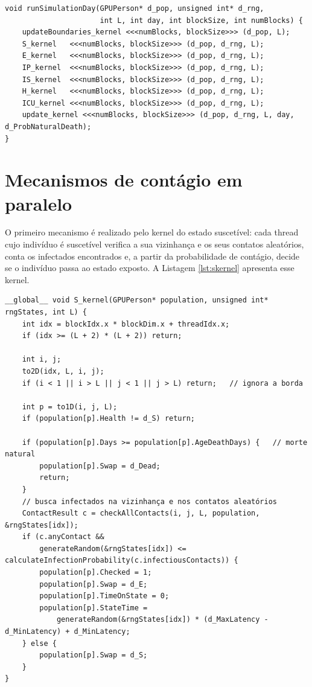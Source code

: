 \documentclass[
	12pt,				%
	openright,			%
	oneside,			%
	a4paper,			%
	english,			%
	french,				%
	spanish,			%
	brazil				%
	]{abntex2}
\begin{document}
\begin{lstlisting}[caption={Sequência de kernels lançada a cada dia.}, label={lst:rundia}]
void runSimulationDay(GPUPerson* d_pop, unsigned int* d_rng,
                      int L, int day, int blockSize, int numBlocks) {
    updateBoundaries_kernel <<<numBlocks, blockSize>>> (d_pop, L);
    S_kernel   <<<numBlocks, blockSize>>> (d_pop, d_rng, L);
    E_kernel   <<<numBlocks, blockSize>>> (d_pop, d_rng, L);
    IP_kernel  <<<numBlocks, blockSize>>> (d_pop, d_rng, L);
    IS_kernel  <<<numBlocks, blockSize>>> (d_pop, d_rng, L);
    H_kernel   <<<numBlocks, blockSize>>> (d_pop, d_rng, L);
    ICU_kernel <<<numBlocks, blockSize>>> (d_pop, d_rng, L);
    update_kernel <<<numBlocks, blockSize>>> (d_pop, d_rng, L, day, d_ProbNaturalDeath);
}
\end{lstlisting}

\section{Mecanismos de contágio em paralelo}

O primeiro mecanismo é realizado pelo kernel do estado suscetível: cada thread cujo indivíduo é suscetível verifica a sua vizinhança e os seus contatos aleatórios, conta os infectados encontrados e, a partir da probabilidade de contágio, decide se o indivíduo passa ao estado exposto. A Listagem \ref{lst:skernel} apresenta esse kernel.

\begin{lstlisting}[caption={Primeiro mecanismo: kernel do estado suscetível.}, label={lst:skernel}]
__global__ void S_kernel(GPUPerson* population, unsigned int* rngStates, int L) {
    int idx = blockIdx.x * blockDim.x + threadIdx.x;
    if (idx >= (L + 2) * (L + 2)) return;

    int i, j;
    to2D(idx, L, i, j);
    if (i < 1 || i > L || j < 1 || j > L) return;   // ignora a borda

    int p = to1D(i, j, L);
    if (population[p].Health != d_S) return;

    if (population[p].Days >= population[p].AgeDeathDays) {   // morte natural
        population[p].Swap = d_Dead;
        return;
    }
    // busca infectados na vizinhança e nos contatos aleatórios
    ContactResult c = checkAllContacts(i, j, L, population, &rngStates[idx]);
    if (c.anyContact &&
        generateRandom(&rngStates[idx]) <= calculateInfectionProbability(c.infectiousContacts)) {
        population[p].Checked = 1;
        population[p].Swap = d_E;
        population[p].TimeOnState = 0;
        population[p].StateTime =
            generateRandom(&rngStates[idx]) * (d_MaxLatency - d_MinLatency) + d_MinLatency;
    } else {
        population[p].Swap = d_S;
    }
}
\end{lstlisting}
\end{document}
